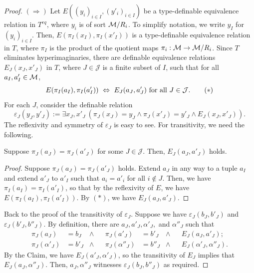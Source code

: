 \begin{proof}
    $(\Rightarrow)$ \quad  Let $E((y_i)_{i\in I},(y'_i)_{i\in I})$ be a type-definable equivalence relation in $T^{eq}$, where $y_i$ is of sort $\mathcal{M}/R_i$. To simplify notation, we write $y_I$ for $(y_i)_{i\in I}$. Then, $E(\pi_I(x_I),\pi_I(x'_I))$ is a type-definable equivalence relation in $T$, where $\pi_I$ is the product of the quotient maps $\pi_i: \mathcal{M}\rightarrow \mathcal{M}/R_i$. Since $T$ eliminates hyperimaginaries, there are definable equivalence relations $E_J(x_J,x'_J)$ in $T$, where $J\in\mathcal{J}$ is a finite subset of $I$, such that for all $a_I,a'_I\in\mathcal{M}$,
    \begin{equation}
        E(\pi_I(a_I),\pi_I(a'_I)) \ \Leftrightarrow \ E_J(a_J,a'_J) \textup{ for all }J\in\mathcal{J}. \tag{$*$}
    \end{equation}  
    For each $J$, consider the definable relation
    \[ \varepsilon_J(y_J,y'_J) := \exists x_J, x'_J \ (\pi_J(x_J)=y_J \wedge \pi_J(x'_J)=y'_J \wedge E_J(x_J, x'_J)). \]
    The reflexivity and symmetry of $\varepsilon_J$ is easy to see. 
    For transitivity, we need the following.

    \begin{claim}\label{EJ RJ}
        Suppose $\pi_J(a_J)=\pi_J(a'_J)$ for some $J\in\mathcal{J}$. Then, $E_J(a_J,a'_J)$ holds.
    \end{claim}

    \begin{proof}
        Suppose $\pi_J(a_J)=\pi_J(a'_J)$ holds. Extend $a_J$ in any way to a tuple $a_I$ and extend $a'_J$ to $a'_I$ such that $a_i = a'_i$ for all $i\not\in J$. Then, we have $\pi_I(a_I)=\pi_I(a'_I)$, so that by the reflexivity of $E$, we have $E(\pi_I(a_I),\pi_I(a'_I))$. By $(\ast)$, we have $E_J(a_J,a'_J)$. 
    \end{proof}
    
    Back to the proof of the transitivity of $\varepsilon_J$. Suppose we have $\varepsilon_J(b_J,b'_J)$ and $\varepsilon_J(b'_J,b''_J)$. By definition, there are $a_J,a'_J,\alpha'_J,$ and $\alpha''_J$ such that 
    \begin{align*}
        \pi_J(a_J) &=b_J &\wedge& &\pi_J(a'_J) &=b'_J &\wedge & &E_J(a_J,a'_J); \\
        \pi_J(\alpha'_J) &= b'_J & \wedge & &\pi_J(\alpha''_J) &=b''_J &\wedge &&E_J(\alpha'_J,\alpha''_J).
    \end{align*}
    By the Claim, we have $E_J(a'_J,\alpha'_J)$, so the transitivity of $E_J$ implies that $E_J(a_J,\alpha''_J)$. Then, $a_J,\alpha''_J$ witnesses $\varepsilon_J(b_J,b''_J)$ as required.
    

\end{proof}
